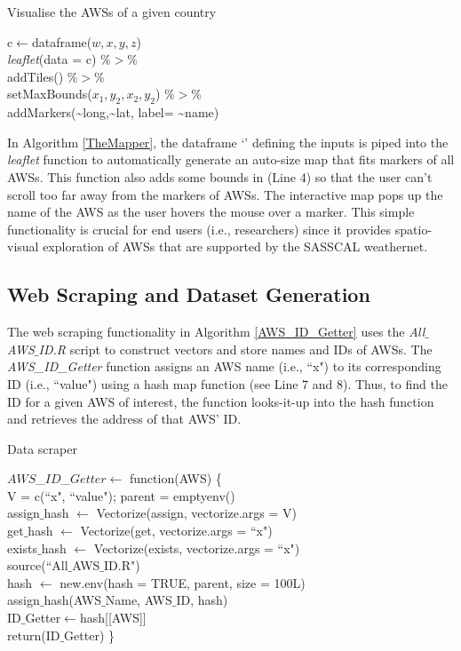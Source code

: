 \documentclass[a4paper, 10pt, conference]{ieeeconf}      %
\begin{document}
	\begin{algorithm}
		\caption{Visualise the AWSs of a given country}
		\label{TheMapper}
			c$\leftarrow$dataframe($w,x,y,z$)\\
			\emph{leaflet}(data = c) $\%>\%$ \\
		addTiles() \%$>$\% \\
  setMaxBounds($x_1,y_2, x_2, y_2$) \%$>$\%\\
  addMarkers(\sim long,\sim lat, label= \sim name)%

	\end{algorithm}
	
	\noindent
In Algorithm \ref{TheMapper}, the dataframe `' defining the inputs  is  piped into the 	\emph{leaflet} function    to automatically generate an auto-size map that fits markers of all  AWSs. This function also   adds some bounds in (Line 4) so that the user can’t scroll too far away from the  markers of AWSs. The interactive map pops up the name of the AWS as the user hovers the mouse over a marker.  This simple functionality is crucial for end users (i.e., researchers) since it provides spatio-visual  exploration  of AWSs that are supported by the SASSCAL weathernet.

\newpage

\subsection{\textbf{Web Scraping and  Dataset Generation}}
\label{Scraper}
\noindent
 The web scraping functionality  in Algorithm \ref{AWS_ID_Getter}  uses the \emph{All$\_$AWS$\_$ID.R} script to construct vectors and store  names and IDs of  AWSs.
  The \emph{AWS\_ID\_Getter} function  assigns an AWS name (i.e., ``x") to its corresponding ID (i.e., ``value") using a hash map function (see Line 7 and 8). 
Thus, to find the ID for a given AWS of interest, the function looks-it-up  into the hash function  and   retrieves the address of that AWS' ID. 
\begin{algorithm}
	\caption{Data scraper}
	\label{AWS_ID_Getter}
$AWS$\_$ID$\_$Getter$$\leftarrow$ function(AWS) \{\\
 V = c(``x", ``value"); parent = emptyenv()\\
  assign$\_$hash $\leftarrow$ Vectorize(assign, vectorize.args = V)\\
  get$\_$hash $\leftarrow$ Vectorize(get, vectorize.args = ``x")\\
  exists$\_$hash $\leftarrow$ Vectorize(exists, vectorize.args = ``x")\\
  source(``All$\_$AWS$\_$ID.R")\\
  hash $\leftarrow$ new.env(hash = TRUE, parent, size = 100L)\\
  assign$\_$hash(AWS$\_$Name, AWS$\_$ID, hash)  \\
  ID$\_$Getter$\leftarrow$hash[[AWS]] \\
  return(ID$\_$Getter)
\}
\end{algorithm}
\end{document}
